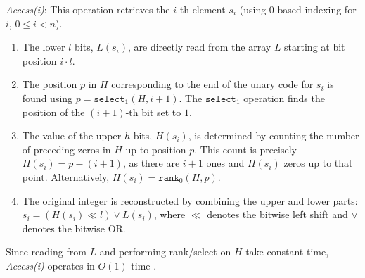 \emph{Access(i)}: This operation retrieves the $i$-th element $s_i$ (using 0-based indexing for $i$, $0 \le i < n$).
\begin{enumerate}
    \item The lower $l$ bits, $L(s_i)$, are directly read from the array $L$ starting at bit position $i \cdot l$.
    \item The position $p$ in $H$ corresponding to the end of the unary code for $s_i$ is found using $p = \texttt{select}_1(H, i+1)$. The $\texttt{select}_1$ operation finds the position of the $(i+1)$-th bit set to $1$.
    \item The value of the upper $h$ bits, $H(s_i)$, is determined by counting the number of preceding zeros in $H$ up to position $p$. This count is precisely $H(s_i) = p - (i+1)$, as there are $i+1$ ones and $H(s_i)$ zeros up to that point. Alternatively, $H(s_i) = \texttt{rank}_0(H, p)$.
    \item The original integer is reconstructed by combining the upper and lower parts: $s_i = (H(s_i) \ll l) \lor L(s_i)$, where $\ll$ denotes the bitwise left shift and $\lor$ denotes the bitwise OR.
\end{enumerate}
Since reading from $L$ and performing rank/select on $H$ take constant time, \emph{Access(i)} operates in $O(1)$ time \cite{pibiri_et_al}.

